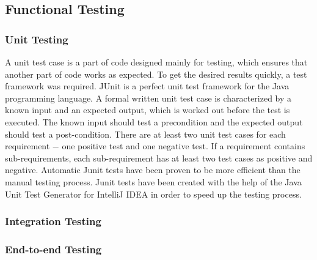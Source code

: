 \subsection{Functional Testing}

\subsubsection{Unit Testing}
A unit test case is a part of code designed mainly for testing, which ensures that another part of code works as expected.
To get the desired results quickly, a test framework was required. JUnit is a perfect unit test framework for the Java programming language.
A formal written unit test case is characterized by a known input and an expected output, which is worked out before the test is executed.
The known input should test a precondition and the expected output should test a post-condition.
There are at least two unit test cases for each requirement − one positive test and one negative test.
If a requirement contains sub-requirements, each sub-requirement has at least two test cases as positive and negative.
Automatic Junit tests have been proven to be more efficient than the manual testing process.
Junit tests have been created with the help of the Java Unit Test Generator for IntelliJ IDEA in order to speed up the testing process.

\subsubsection{Integration Testing}

\subsubsection{End-to-end Testing}

